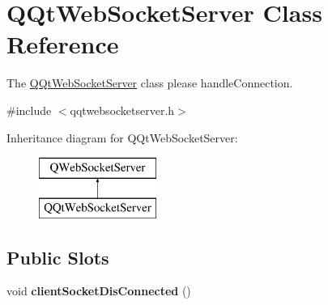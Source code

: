 \hypertarget{class_q_qt_web_socket_server}{}\section{Q\+Qt\+Web\+Socket\+Server Class Reference}
\label{class_q_qt_web_socket_server}


The \mbox{\hyperlink{class_q_qt_web_socket_server}{Q\+Qt\+Web\+Socket\+Server}} class please handle\+Connection.  




{\ttfamily \#include $<$qqtwebsocketserver.\+h$>$}

Inheritance diagram for Q\+Qt\+Web\+Socket\+Server\+:\begin{figure}[H]
\begin{center}
\leavevmode
\includegraphics[height=2.000000cm]{class_q_qt_web_socket_server}
\end{center}
\end{figure}
\subsection*{Public Slots}
\begin{DoxyCompactItemize}
\item 
\mbox{\label{class_q_qt_web_socket_server_a1e30072fd8b7840ce05113b388b52b8a}} 
void {\bfseries client\+Socket\+Dis\+Connected} ()
\end{DoxyCompactItemize}
